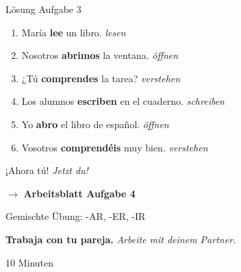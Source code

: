 \documentclass[aspectratio=169, 11pt]{beamer}
\newcommand{\seriftext}[1]{{\fontfamily{ppl}\selectfont #1}}
\newcommand{\es}[1]{\seriftext{\textbf{#1}}}
\newcommand{\de}[1]{\textit{\textcolor{mittelgrau}{#1}}}
\newcommand{\abmark}[1]{{\Large$\rightarrow$ \textbf{Arbeitsblatt Aufgabe #1}}}
\newcommand{\zeit}[1]{{\small\textcolor{mittelgrau}{#1}}}
\begin{document}
\begin{frame}{Lösung Aufgabe 3}
    \vspace{0.3cm}

    \begin{enumerate}[label=\alph*)]
        \setlength{\itemsep}{0.4cm}
        \item María \textcolor{richtig}{\textbf{lee}} un libro. \de{lesen}
        \item Nosotros \textcolor{richtig}{\textbf{abrimos}} la ventana. \de{öffnen}
        \item ¿Tú \textcolor{richtig}{\textbf{comprendes}} la tarea? \de{verstehen}
        \item Los alumnos \textcolor{richtig}{\textbf{escriben}} en el cuaderno. \de{schreiben}
        \item Yo \textcolor{richtig}{\textbf{abro}} el libro de español. \de{öffnen}
        \item Vosotros \textcolor{richtig}{\textbf{comprendéis}} muy bien. \de{verstehen}
    \end{enumerate}
\end{frame}

\begin{frame}{¡Ahora tú! \de{Jetzt du!}}
    \vspace{1cm}

    \begin{center}
        \abmark{4}

        \vspace{0.8cm}

        {\large Gemischte Übung: -AR, -ER, -IR}

        \vspace{0.8cm}

        \es{Trabaja con tu pareja.} \de{Arbeite mit deinem Partner.}

        \vspace{0.5cm}

        \zeit{10 Minuten}
    \end{center}
\end{frame}
\end{document}
